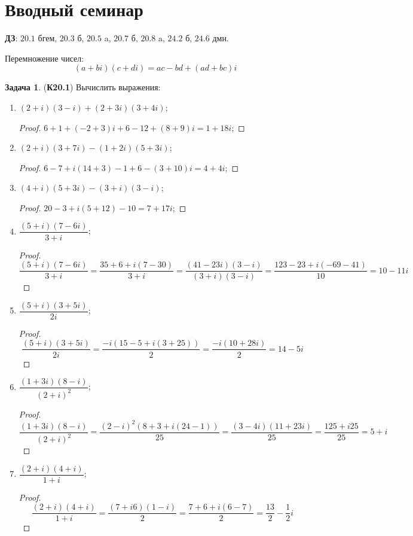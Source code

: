 \documentclass[12pt]{article}
\newcommand{\RN}[1]{%
	\textup{\uppercase\expandafter{\romannumeral#1}}%
}
\theoremstyle{definition}
\newtheorem{problem}{Задача}
\begin{document}
\lhead{Алгебра-\RN{1}}
\section*{Вводный семинар}
\textbf{ДЗ}: $20.1$ бгем, $20.3$ б, $20.5$ a, $20.7$ б, $20.8$ a, $24.2$ б, $24.6$ дмн.

Перемножение чисел:
$$
	(a + bi)(c + di) = ac - bd + (ad + bc)i
$$
\begin{problem}(\textbf{К20.1})
	Вычислить выражения:
	\begin{enumerate}[label=\asbuk*)]
		\item $(2 + i)(3-i) + (2+3i)(3 + 4i)$;
		\begin{proof}
			$6 +1 + (-2 +3)i + 6 -12 + (8 +9)i = 1 + 18i$;
		\end{proof}
		\item $(2 + i)(3 + 7i) - (1 + 2i)(5 + 3i)$;
		\begin{proof}
			$6 - 7 + i(14 + 3) - 1 + 6 -(3 + 10)i = 4 + 4i$;
		\end{proof}
		\item $(4 + i)(5 + 3i) - (3 + i)(3-i)$;
		\begin{proof}
			$20 - 3 + i(5 + 12) - 10 = 7 + 17i$;
		\end{proof}
		\item $\dfrac{(5+i)(7-6i)}{3+i}$;
		\begin{proof}
			$$
				\dfrac{(5+i)(7-6i)}{3+i} = \dfrac{35 + 6 + i(7 -30)}{3+i} = \dfrac{(41 - 23i)(3-i)}{(3 +i)(3-i)} = \dfrac{123 - 23 + i(-69-41)}{10}= 10 -11i
			$$
		\end{proof}
		\item $\dfrac{(5 +i )(3 + 5i)}{2i}$;
		\begin{proof}
			$$
				\dfrac{(5 +i )(3 + 5i)}{2i} = \dfrac{-i(15 - 5 + i(3 + 25))}{2} = \dfrac{-i(10 +28i)}{2} = 14 -5i
			$$
		\end{proof}
		\item $\dfrac{(1+3i)(8-i)}{(2 + i)^2}$;
		\begin{proof}
			$$
				\dfrac{(1+3i)(8-i)}{(2 + i)^2} = \dfrac{(2-i)^2(8 + 3 + i(24 -1))}{25} = \dfrac{(3-4i)(11 +23i)}{25} = \dfrac{125 + i25}{25} = 5 + i
			$$
		\end{proof}
		\item $\dfrac{(2+i)(4+i)}{1+i}$;
		\begin{proof}
			$$
				\dfrac{(2+i)(4+i)}{1+i} = \dfrac{(7 +i6)(1-i)}{2} = \dfrac{7 + 6 + i(6 -7)}{2} = \dfrac{13}{2} -\dfrac{1}{2}i
			$$
		\end{proof}

\end{enumerate}
\end{problem}
\end{document}
